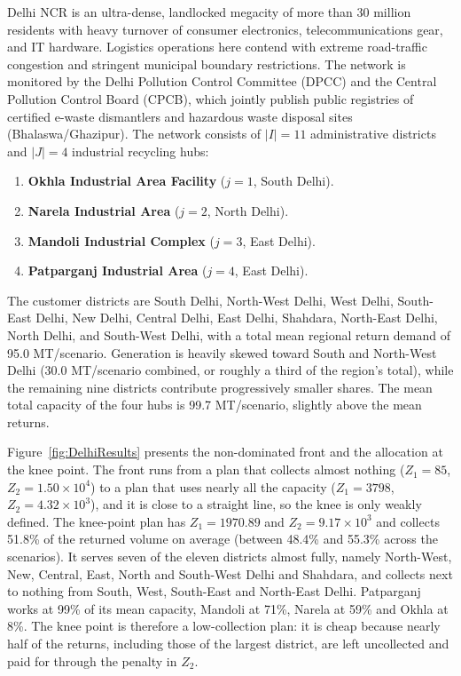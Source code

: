 \documentclass[11pt, a4paper]{article}
\begin{document}
Delhi NCR is an ultra-dense, landlocked megacity of more than 30 million residents with heavy turnover of consumer electronics, telecommunications gear, and IT hardware. Logistics operations here contend with extreme road-traffic congestion and stringent municipal boundary restrictions. The network is monitored by the Delhi Pollution Control Committee (DPCC) and the Central Pollution Control Board (CPCB), which jointly publish public registries of certified e-waste dismantlers and hazardous waste disposal sites (Bhalaswa/Ghazipur). The network consists of $|I| = 11$ administrative districts and $|J| = 4$ industrial recycling hubs:
\begin{enumerate}
    \item \textbf{Okhla Industrial Area Facility} ($j=1$, South Delhi).
    \item \textbf{Narela Industrial Area} ($j=2$, North Delhi).
    \item \textbf{Mandoli Industrial Complex} ($j=3$, East Delhi).
    \item \textbf{Patparganj Industrial Area} ($j=4$, East Delhi).
\end{enumerate}
The customer districts are South Delhi, North-West Delhi, West Delhi, South-East Delhi, New Delhi, Central Delhi, East Delhi, Shahdara, North-East Delhi, North Delhi, and South-West Delhi, with a total mean regional return demand of 95.0 MT/scenario. Generation is heavily skewed toward South and North-West Delhi (30.0 MT/scenario combined, or roughly a third of the region's total), while the remaining nine districts contribute progressively smaller shares. The mean total capacity of the four hubs is 99.7 MT/scenario, slightly above the mean returns.

Figure~\ref{fig:DelhiResults} presents the non-dominated front and the allocation at the knee point. The front runs from a plan that collects almost nothing ($Z_1 = 85$, $Z_2 = 1.50\times10^{4}$) to a plan that uses nearly all the capacity ($Z_1 = 3798$, $Z_2 = 4.32\times10^{3}$), and it is close to a straight line, so the knee is only weakly defined. The knee-point plan has $Z_1 = 1970.89$ and $Z_2 = 9.17\times10^{3}$ and collects 51.8\% of the returned volume on average (between 48.4\% and 55.3\% across the scenarios). It serves seven of the eleven districts almost fully, namely North-West, New, Central, East, North and South-West Delhi and Shahdara, and collects next to nothing from South, West, South-East and North-East Delhi. Patparganj works at 99\% of its mean capacity, Mandoli at 71\%, Narela at 59\% and Okhla at 8\%. The knee point is therefore a low-collection plan: it is cheap because nearly half of the returns, including those of the largest district, are left uncollected and paid for through the penalty in $Z_2$.
\end{document}
